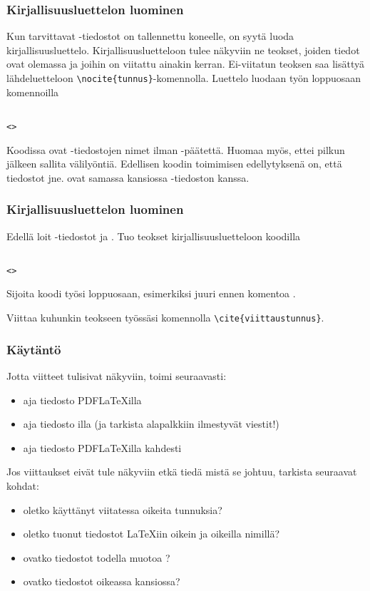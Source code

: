 \begin{fframe}
    \frametitle{Kirjallisuusluettelon luominen}
    Kun tarvittavat -tiedostot on tallennettu koneelle, on syytä luoda kirjallisuusluettelo. Kirjallisuusluetteloon tulee näkyviin ne teokset, joiden tiedot ovat olemassa ja joihin on viitattu ainakin kerran. Ei-viitatun teoksen saa lisättyä lähdeluetteloon \lstinline-\nocite{tunnus}--komennolla.
    \vaihto
    Luettelo luodaan työn loppuosaan komennoilla
    \begin{lstlisting}

<>
    \end{lstlisting}
    Koodissa  ovat -tiedostojen nimet ilman -päätettä. Huomaa myös, ettei pilkun jälkeen sallita välilyöntiä.
    \vaihto
    Edellisen koodin toimimisen edellytyksenä on, että tiedostot  jne. ovat samassa kansiossa -tiedoston kanssa. 
\end{fframe}

\begin{fframe}
    \frametitle{Kirjallisuusluettelon luominen}
    \begin{harj}
        Edellä loit \BibTeX-tiedostot  ja . Tuo teokset kirjallisuusluetteloon koodilla 
        \begin{lstlisting}

<>
        \end{lstlisting}
        Sijoita koodi työsi loppuosaan, esimerkiksi juuri ennen komentoa \lstinline--.
    \end{harj}
    \begin{harj}
        Viittaa kuhunkin teokseen työssäsi komennolla \lstinline-\cite{viittaustunnus}-.
    \end{harj}
\end{fframe}
\begin{fframe}
    \frametitle{Käytäntö}
    Jotta viitteet tulisivat näkyviin, toimi seuraavasti:
    \begin{itemize}
        \item aja tiedosto PDFLaTeXilla
        \item aja tiedosto \BibTeX{}illa (ja tarkista alapalkkiin ilmestyvät viestit!)
        \item aja tiedosto PDFLaTeXilla kahdesti
    \end{itemize} 
    Jos viittaukset eivät tule näkyviin etkä tiedä mistä se johtuu, tarkista seuraavat kohdat:
    \begin{itemize}
        \item oletko käyttänyt viitatessa oikeita tunnuksia?
        \item oletko tuonut tiedostot \LaTeX iin oikein ja oikeilla nimillä?
        \item ovatko tiedostot todella muotoa ?
        \item ovatko tiedostot oikeassa kansiossa?
    \end{itemize}
\end{fframe}

